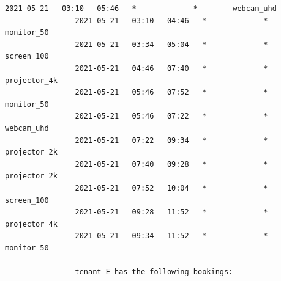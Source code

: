 \documentclass{article}
\begin{document}
\begin{Verbatim}[gobble=8]
                2021-05-21   03:10   05:46   *             *        webcam_uhd
                2021-05-21   03:10   04:46   *             *        monitor_50
                2021-05-21   03:34   05:04   *             *        screen_100
                2021-05-21   04:46   07:40   *             *        projector_4k
                2021-05-21   05:46   07:52   *             *        monitor_50
                2021-05-21   05:46   07:22   *             *        webcam_uhd
                2021-05-21   07:22   09:34   *             *        projector_2k
                2021-05-21   07:40   09:28   *             *        projector_2k
                2021-05-21   07:52   10:04   *             *        screen_100
                2021-05-21   09:28   11:52   *             *        projector_4k
                2021-05-21   09:34   11:52   *             *        monitor_50
                
                tenant_E has the following bookings:
                

\end{Verbatim}
\end{document}
